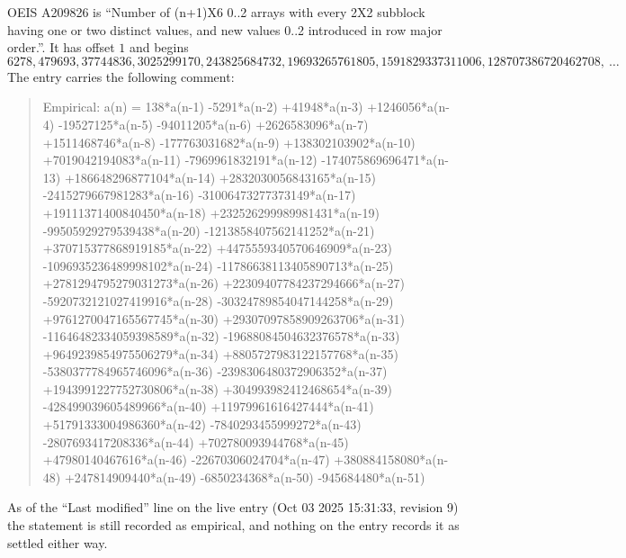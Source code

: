 \documentclass[11pt,a4paper]{article}
\theoremstyle{plain}
\theoremstyle{definition}
\begin{document}
OEIS A209826 is ``Number of (n+1)X6 0..2 arrays with every 2X2 subblock having one or two distinct values, and new values 0..2 introduced in row major order.''. It has offset $1$ and begins
\[
6278, 479693, 37744836, 3025299170, 243825684732, 19693265761805, 1591829337311006, 128707386720462708,\ \dots
\]
The entry carries the following comment:
\begin{quote}\small
Empirical: a(n) = 138*a(n-1) -5291*a(n-2) +41948*a(n-3) +1246056*a(n-4) -19527125*a(n-5) -94011205*a(n-6) +2626583096*a(n-7) +1511468746*a(n-8) -177763031682*a(n-9) +138302103902*a(n-10) +7019042194083*a(n-11) -7969961832191*a(n-12) -174075869696471*a(n-13) +186648296877104*a(n-14) +2832030056843165*a(n-15) -2415279667981283*a(n-16) -31006473277373149*a(n-17) +19111371400840450*a(n-18) +232526299989981431*a(n-19) -99505929279539438*a(n-20) -1213858407562141252*a(n-21) +370715377868919185*a(n-22) +4475559340570646909*a(n-23) -1096935236489998102*a(n-24) -11786638113405890713*a(n-25) +2781294795279031273*a(n-26) +22309407784237294666*a(n-27) -5920732121027419916*a(n-28) -30324789854047144258*a(n-29) +9761270047165567745*a(n-30) +29307097858909263706*a(n-31) -11646482334059398589*a(n-32) -19688084504632376578*a(n-33) +9649239854975506279*a(n-34) +8805727983122157768*a(n-35) -5380377784965746096*a(n-36) -2398306480372906352*a(n-37) +1943991227752730806*a(n-38) +304993982412468654*a(n-39) -428499039605489966*a(n-40) +11979961616427444*a(n-41) +51791333004986360*a(n-42) -7840293455999272*a(n-43) -2807693417208336*a(n-44) +702780093944768*a(n-45) +47980140467616*a(n-46) -22670306024704*a(n-47) +380884158080*a(n-48) +247814909440*a(n-49) -6850234368*a(n-50) -945684480*a(n-51)
\end{quote}
As of the ``Last modified'' line on the live entry (Oct 03 2025 15:31:33, revision 9) the statement is
still recorded as empirical, and nothing on the entry records it as settled either way.
\end{document}
